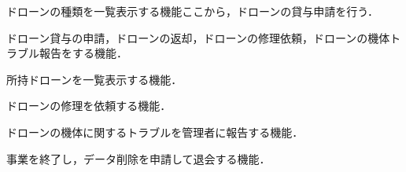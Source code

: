 \documentclass[a4paper, titlepage]{jsarticle}
\begin{document}
\begin{description}[labelwidth=\linewidth]
  \item [ドローン種類一覧機能]ドローンの種類を一覧表示する機能ここから，ドローンの貸与申請を行う．
  \item [ドローン貸与申請機能] ドローン貸与の申請，ドローンの返却，ドローンの修理依頼，ドローンの機体トラブル報告をする機能．
  \item [所持ドローン一覧機能]所持ドローンを一覧表示する機能．
  \item [ドローンの修理依頼機能]ドローンの修理を依頼する機能．
  \item [ドローンの機体トラブル報告]ドローンの機体に関するトラブルを管理者に報告する機能．
  \item [退会機能] 事業を終了し，データ削除を申請して退会する機能．
\end{description}
\end{document}
